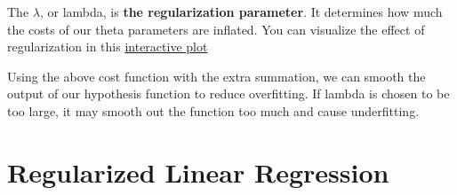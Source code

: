 The $\lambda$, or lambda, is \textbf{the regularization parameter}. It determines how much the costs of our theta parameters are inflated. You can visualize the effect of regularization in this \href{https://www.desmos.com/calculator/1hexc8ntqp}{interactive plot}

Using the above cost function with the extra summation, we can smooth the output of our hypothesis function to reduce overfitting. If lambda is chosen to be too large, it may smooth out the function too much and cause underfitting.

\section{Regularized Linear Regression}
